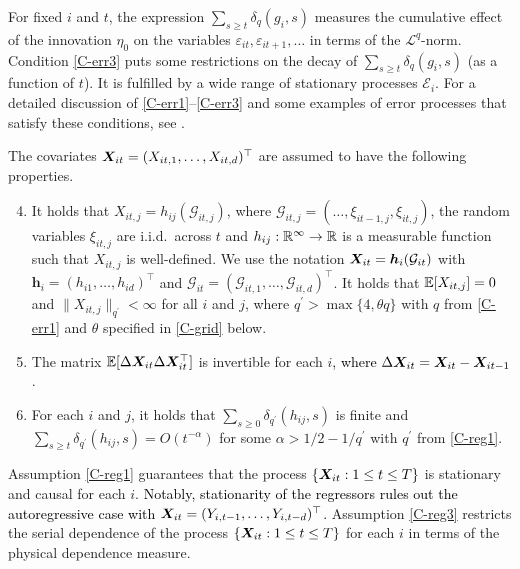 \documentclass[12pt]{article}
\begin{document}
For fixed $i$ and $t$, the expression $\sum\nolimits_{s \ge t} \delta_q(g_i, s)$ measures the cumulative effect of the innovation $\eta_0$ on the variables $\varepsilon_{it}, \varepsilon_{it+1},\ldots$ in terms of the $\mathcal{L}^q$-norm. Condition \ref{C-err3} puts some restrictions on the decay of $\sum\nolimits_{s \ge t} \delta_q(g_i, s)$ (as a function of $t$). It is fulfilled by a wide range of stationary processes $\mathcal{E}_i$. For a detailed discussion of \ref{C-err1}--\ref{C-err3} and some examples of error processes that satisfy these conditions, see \cite{KhismatullinaVogt2020}.


The covariates $\boldsymbol{X}_{it} = (X_{it,1},\ldots, X_{it, d})^\top$ are assumed to have the following properties. 
\begin{enumerate}[label=(C\arabic*),leftmargin=1.05cm, itemsep=0pt, parsep=0pt, topsep=3pt]
\setcounter{enumi}{3}
\item \label{C-reg1} It holds that $X_{it, j} = h_{ij}(\mathcal{G}_{it, j})$, where $\mathcal{G}_{it, j} = (\ldots, \xi_{it-1,j}, \xi_{it, j})$, the random variables $\xi_{it, j}$ are i.i.d.\ across $t$ and $h_{ij}: \mathbb{R}^\infty \rightarrow \mathbb{R}$ is a measurable function such that $X_{it, j}$ is well-defined. We use the notation $\boldsymbol{X}_{it} = \boldsymbol{h}_{i}(\mathcal{G}_{it})$ with $\boldsymbol{h}_i = (h_{i1}, \ldots, h_{id})^\top$ and $\mathcal{G}_{it} = (\mathcal{G}_{it,1}, \ldots, \mathcal{G}_{it, d})^\top$. It holds that $\mathbb{E} [X_{it, j}]=0$ and $\| X_{it, j} \|_{q^\prime} <\infty$ for all $i$ and $j$, where $q^\prime > \max \{ 4, \theta q \}$ with $q$ from \ref{C-err1} and $\theta$ specified in \ref{C-grid} below.
\item \label{C-reg2} The matrix $\mathbb{E}[\Delta \boldsymbol{X}_{it} \Delta \boldsymbol{X}_{it}^\top]$ is invertible for each $i$\textcolor{black}{, where $\Delta \boldsymbol{X}_{it} = \boldsymbol{X}_{it} - \boldsymbol{X}_{it-1}$}.
\item \label{C-reg3} For each $i$ and $j$, it holds that $\sum_{s \ge 0} \delta_{q^\prime}(h_{ij}, s)$ is finite and $\sum_{s \ge t} \delta_{q^\prime}(h_{ij}, s)= O(t^{-\alpha})$ for some $\alpha > 1/2 - 1/{q^\prime}$ with $q^\prime$ from \ref{C-reg1}.
\end{enumerate}
Assumption \ref{C-reg1} guarantees that the process $\{ \boldsymbol{X}_{it}: 1 \le t \le T \}$ is stationary and causal for each $i$. \textcolor{black}{Notably, stationarity of the regressors rules out the autoregressive case with $\boldsymbol{X}_{it} = (Y_{i,t-1},\ldots,Y_{i,t-d})^\top$.} Assumption \ref{C-reg3} restricts the serial dependence of the process $\{ \boldsymbol{X}_{it}: 1 \le t \le T \}$ for each $i$ in terms of the physical dependence measure. 
\end{document}
